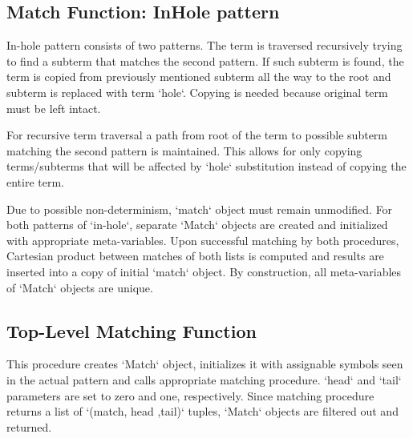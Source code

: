 \subsection{Match Function: InHole pattern}
In-hole pattern consists of two patterns. The term is traversed recursively trying to find a subterm that matches the second pattern. If such subterm is found, the term is copied from previously mentioned subterm all the way to the root and subterm is replaced with term `hole`. Copying is needed because original term must be left intact.

For recursive term traversal a path from root of the term to possible subterm matching the second pattern is maintained. This allows for only copying terms/subterms that will be affected by `hole` substitution instead of copying the entire term.

Due to possible non-determinism, `match` object must remain unmodified. For both patterns of `in-hole`, separate `Match` objects are created and initialized with appropriate meta-variables. Upon successful matching by both procedures, Cartesian product between matches of both lists is computed and results are inserted into a copy of initial `match` object. By construction, all meta-variables of `Match` objects are unique.


\subsection{Top-Level Matching Function}

This procedure creates `Match` object, initializes it with assignable symbols seen in the actual pattern and calls appropriate matching procedure. `head` and `tail` parameters are set to zero and one, respectively. Since matching procedure returns a list of `(match, head ,tail)` tuples, `Match` objects are filtered out and returned.

